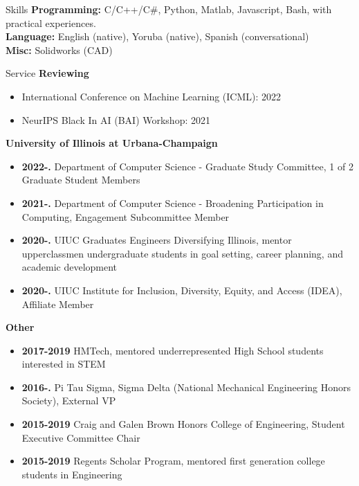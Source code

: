 \documentclass{resume} %
\begin{document}
\begin{rSection}{Skills}
\textbf{Programming:} C/C++/C\#, Python, Matlab, Javascript, Bash, with practical experiences.\\
\textbf{Language:} English (native), Yoruba (native), Spanish (conversational)\\
\textbf{Misc:} Solidworks (CAD) 
\end{rSection}


\begin{rSection}{Service}
\textbf{Reviewing}
\begin{itemize}
    \item  International Conference on Machine Learning (ICML): 2022
    \item NeurIPS Black In AI (BAI) Workshop: 2021
\end{itemize}

\textbf{University of Illinois at Urbana-Champaign}
\begin{itemize}
    \item \textbf{2022-.} Department of Computer Science - Graduate Study Committee, 1 of 2 Graduate Student Members
    \item \textbf{2021-.} Department of Computer Science - Broadening Participation in Computing, Engagement Subcommittee Member
    \item \textbf{2020-.} UIUC Graduates Engineers Diversifying Illinois, mentor upperclassmen undergraduate students in goal setting, career planning, and academic development
    \item \textbf{2020-.} UIUC Institute for Inclusion, Diversity, Equity, and Access (IDEA), Affiliate Member
\end{itemize}

\textbf{Other}
\begin{itemize}
    \item \textbf{2017-2019} HMTech, mentored underrepresented High School students interested in STEM
    \item \textbf{2016-.} Pi Tau Sigma, Sigma Delta (National Mechanical Engineering Honors Society), External VP
    \item \textbf{2015-2019} Craig and Galen Brown Honors College of Engineering, Student Executive Committee Chair
    \item \textbf{2015-2019} Regents Scholar Program, mentored first generation college students in Engineering
\end{itemize}
\end{rSection}
\end{document}
